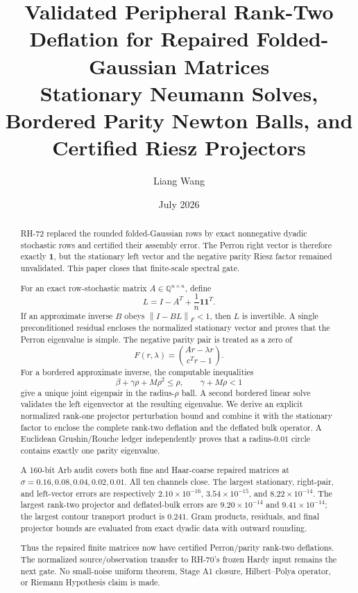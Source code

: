 \documentclass[11pt]{article}
\title{Validated Peripheral Rank-Two Deflation for Repaired Folded-Gaussian Matrices\\
\large Stationary Neumann Solves, Bordered Parity Newton Balls, and Certified Riesz Projectors}
\author{Liang Wang}
\date{July 2026}
\theoremstyle{definition}
\newcommand{\norm}[1]{\left\lVert#1\right\rVert}
\newcommand{\one}{\mathbf 1}
\begin{document}
\maketitle

\begin{abstract}
RH-72 replaced the rounded folded-Gaussian rows by exact nonnegative dyadic
stochastic rows and certified their assembly error.  The Perron right vector
is therefore exactly $\one$, but the stationary left vector and the negative
parity Riesz factor remained unvalidated.  This paper closes that finite-scale
spectral gate.

For an exact row-stochastic matrix $A\in\mathbb Q^{n\times n}$, define
\[
 L=I-A^T+\frac1n\one\one^T.
\]
If an approximate inverse $B$ obeys $\norm{I-BL}_F<1$, then $L$ is
invertible.  A single preconditioned residual encloses the normalized
stationary vector and proves that the Perron eigenvalue is simple.  The
negative parity pair is treated as a zero of
\[
 F(r,\lambda)=\binom{Ar-\lambda r}{c^Tr-1}.
\]
For a bordered approximate inverse, the computable inequalities
\[
 \beta+\gamma\rho+M\rho^2\le\rho,
 \qquad \gamma+M\rho<1
\]
give a unique joint eigenpair in the radius-$\rho$ ball.  A second bordered
linear solve validates the left eigenvector at the resulting eigenvalue.
We derive an explicit normalized rank-one projector perturbation bound and
combine it with the stationary factor to enclose the complete rank-two
deflation and the deflated bulk operator.  A Euclidean Grushin/Rouche ledger
independently proves that a radius-$0.01$ circle contains exactly one parity
eigenvalue.

A 160-bit Arb audit covers both fine and Haar-coarse repaired matrices at
$\sigma=0.16,0.08,0.04,0.02,0.01$.  All ten channels close.  The largest
stationary, right-pair, and left-vector errors are respectively
$2.10\times10^{-16}$, $3.54\times10^{-15}$, and
$8.22\times10^{-14}$.  The largest rank-two projector and deflated-bulk
errors are $9.20\times10^{-14}$ and $9.41\times10^{-14}$; the largest
contour transport product is $0.241$.  Gram products, residuals, and final
projector bounds are evaluated from exact dyadic data with outward rounding.

Thus the repaired finite matrices now have certified Perron/parity
rank-two deflations.  The normalized source/observation transfer to RH-70's
frozen Hardy input remains the next gate.  No small-noise uniform theorem,
Stage A1 closure, Hilbert--Polya operator, or Riemann Hypothesis claim is made.
\end{abstract}
\end{document}
